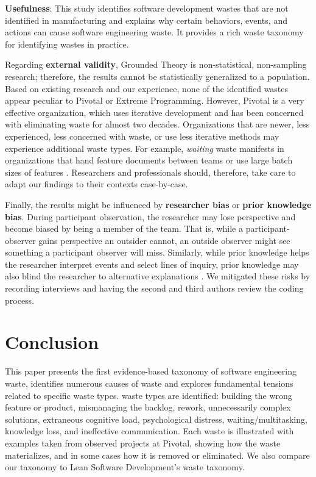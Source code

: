 \textbf{Usefulness}:  This study identifies software development wastes that are not identified in manufacturing and explains why certain behaviors, events, and actions can cause software engineering waste. It provides a rich waste taxonomy for identifying wastes in practice. %

Regarding \textbf{external validity}, Grounded Theory is non-statistical, non-sampling research; therefore, the results cannot be statistically generalized to a population. Based on existing research and our experience, none of the identified wastes appear peculiar to Pivotal or Extreme Programming. However, Pivotal is a very effective organization, which uses iterative development and has been concerned with eliminating waste for almost two decades. Organizations that are newer, less experienced, less concerned with waste, or use less iterative methods may experience additional waste types. For example, \textit{waiting} waste manifests in organizations that hand feature documents between teams or use large batch sizes of features \cite{Ali2016, Khurum2014, Mujtaba2010}. Researchers and professionals should, therefore, take care to adapt our findings to their contexts case-by-case. 

Finally, the results might be influenced by \textbf{researcher bias} or \textbf{prior knowledge bias}. During participant observation, the researcher may lose perspective and become biased by being a member of the team. That is, while a participant-observer gains perspective an outsider cannot, an outside observer might see something a participant observer will miss. Similarly, while prior knowledge helps the researcher interpret events and select lines of inquiry, prior knowledge may also blind the researcher to alternative explanations \cite{GlaserIssues}. We mitigated these risks by recording interviews and having the second and third authors review the coding process.
\section{Conclusion}
\label{Conclusion}
This paper presents the first evidence-based taxonomy of software engineering waste, identifies numerous causes of waste and explores fundamental tensions related to specific waste types. \numberOfWastesCapitalized{} waste types are identified: building the wrong feature or product, mismanaging the backlog, rework, unnecessarily complex solutions, extraneous cognitive load, 
psychological distress, waiting/multitasking, knowledge loss, and ineffective communication. Each waste is illustrated with examples taken from observed projects at Pivotal, showing how the waste materializes, and in some cases how it is removed or eliminated. We also compare our taxonomy to Lean Software Development's waste taxonomy.


